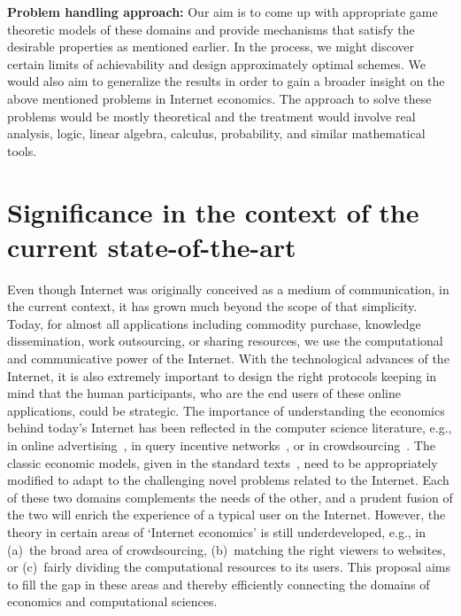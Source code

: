 \documentclass[10pt,psfig,letter]{article}
\begin{document}
\noindent
{\bf Problem handling approach:}
Our aim is to come up with appropriate game theoretic models of these domains and provide mechanisms that satisfy the desirable properties as mentioned earlier. In the process, we might discover certain limits of achievability and design approximately optimal schemes. We would also aim to generalize the results in order to gain a broader insight on the above mentioned problems in Internet economics. The approach to solve these problems would be mostly theoretical and the treatment would involve real analysis, logic, linear algebra, calculus, probability, and similar mathematical tools.


\section{Significance in the context of the current state-of-the-art}

Even though Internet was originally conceived as a medium of communication, in the current context, it has grown much beyond the scope of that simplicity. Today, for almost all applications including commodity purchase, knowledge dissemination, work outsourcing, or sharing resources, we use the computational and communicative power of the Internet. With the technological advances of the Internet, it is also extremely important to design the right protocols keeping in mind that the human participants, who are the end users of these online applications, could be strategic. The importance of understanding the economics behind today's Internet has been reflected in the computer science literature, e.g., in online advertising~\cite{edelman2005internet, varian2007position}, in query incentive networks~\cite{Kleinberg2005}, or in crowdsourcing~\cite{Pickard2011}. The classic economic models, given in the standard texts~\cite{MASCOLELL95, krishna2009auction}, need to be appropriately modified to adapt to the 
challenging novel problems related to the Internet. Each of these two domains complements the needs of the other, and a prudent fusion of the two will enrich the experience of a typical user on the Internet. However, the theory in certain areas of `Internet economics' is still underdeveloped, e.g., in (a)~the broad area of crowdsourcing, (b)~matching the right viewers to websites, or (c)~fairly dividing the computational resources to its users. This proposal aims to fill the gap in these areas and thereby efficiently connecting the domains of economics and computational sciences.
\end{document}
